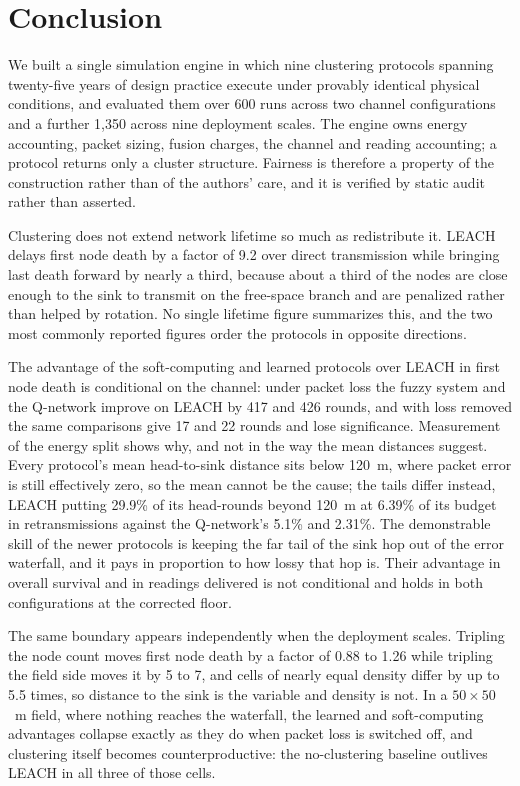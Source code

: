 \section{Conclusion}
\label{sec:conclusion}

We built a single simulation engine in which nine clustering protocols spanning
twenty-five years of design practice execute under provably identical physical
conditions, and evaluated them over 600 runs across two channel configurations
and a further 1{,}350 across nine deployment scales. The engine owns energy
accounting, packet sizing, fusion charges, the channel and reading accounting; a
protocol returns only a cluster structure. Fairness is therefore a property of
the construction rather than of the authors' care, and it is verified by static
audit rather than asserted.

Clustering does not extend network lifetime so much as redistribute it. LEACH
delays first node death by a factor of 9.2 over direct transmission while
bringing last death forward by nearly a third, because about a third of the
nodes are close enough to the sink to transmit on the free-space branch and are
penalized rather than helped by rotation. No single lifetime figure summarizes
this, and the two most commonly reported figures order the protocols in opposite
directions.

The advantage of the soft-computing and learned protocols over LEACH in first
node death is conditional on the channel: under packet loss the fuzzy system and
the Q-network improve on LEACH by 417 and 426 rounds, and with loss removed the
same comparisons give 17 and 22 rounds and lose significance. Measurement of the
energy split shows why, and not in the way the mean distances suggest. Every
protocol's mean head-to-sink distance sits below 120~m, where packet error is
still effectively zero, so the mean cannot be the cause; the tails differ
instead, LEACH putting 29.9\% of its head-rounds beyond 120~m at 6.39\% of its
budget in retransmissions against the Q-network's 5.1\% and 2.31\%. The
demonstrable skill of the newer protocols is keeping the far tail of the sink
hop out of the error waterfall, and it pays in proportion to how lossy that hop
is. Their advantage in overall survival and in readings delivered is not
conditional and holds in both configurations at the corrected floor.

The same boundary appears independently when the deployment scales. Tripling the
node count moves first node death by a factor of 0.88 to 1.26 while tripling the
field side moves it by 5 to 7, and cells of nearly equal density differ by up to
5.5 times, so distance to the sink is the variable and density is not. In a
$50\times50$~m field, where nothing reaches the waterfall, the learned and
soft-computing advantages collapse exactly as they do when packet loss is
switched off, and clustering itself becomes counterproductive: the no-clustering
baseline outlives LEACH in all three of those cells.

